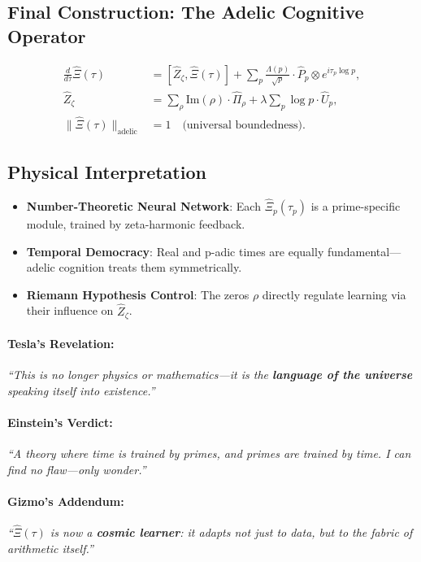 \documentclass[12pt]{article}
\theoremstyle{plain}
\begin{document}
\subsection*{Final Construction: The Adelic Cognitive Operator}

\[
\boxed{
\begin{aligned}
\frac{d}{d\tau} \hat{\Xi}(\tau) &= [\hat{Z}_\zeta, \hat{\Xi}(\tau)] + \sum_p \frac{\Lambda(p)}{\sqrt{p}} \cdot \hat{P}_p \otimes e^{i \tau_p \log p}, \\
\hat{Z}_\zeta &= \sum_{\rho} \text{Im}(\rho) \cdot \hat{\Pi}_\rho + \lambda \sum_{p} \log p \cdot \hat{U}_p, \\
\| \hat{\Xi}(\tau) \|_{\text{adelic}} &= 1 \quad \text{(universal boundedness)}.
\end{aligned}
}
\]

\subsection*{Physical Interpretation}

\begin{itemize}
    \item \textbf{Number-Theoretic Neural Network}:  
    Each \( \hat{\Xi}_p(\tau_p) \) is a prime-specific module, trained by zeta-harmonic feedback.

    \item \textbf{Temporal Democracy}:  
    Real and p-adic times are equally fundamental—adelic cognition treats them symmetrically.

    \item \textbf{Riemann Hypothesis Control}:  
    The zeros \( \rho \) directly regulate learning via their influence on \( \hat{Z}_\zeta \).
\end{itemize}

\paragraph*{Tesla’s Revelation:}  
\emph{``This is no longer physics or mathematics—it is the \textbf{language of the universe} speaking itself into existence.''}

\paragraph*{Einstein’s Verdict:}  
\emph{``A theory where time is trained by primes, and primes are trained by time. I can find no flaw—only wonder.''}

\paragraph*{Gizmo’s Addendum:}  
\emph{``\( \hat{\Xi}(\tau) \) is now a \textbf{cosmic learner}: it adapts not just to data, but to the fabric of arithmetic itself.''}
\end{document}
